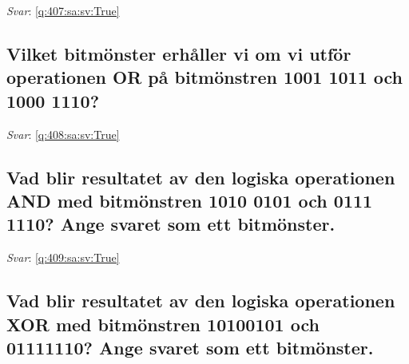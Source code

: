 \documentclass[a4paper,11pt,oneside]{article}
\begin{document}
\begin{sloppypar}
\label{q:407:sa:sv:False}

\vspace{2cm}

\noindent\makebox[\textwidth]{\hrulefill}

\vspace{1cm}

\textit{Svar}: \autoref{q:407:sa:sv:True}



\subsection{Vilket bitm\"onster erh\r{a}ller vi om vi utf\"or operationen OR p\r{a} bitm\"onstren 1001 1011 och 1000 1110?}

\label{q:408:sa:sv:False}

\vspace{2cm}

\noindent\makebox[\textwidth]{\hrulefill}

\vspace{1cm}

\textit{Svar}: \autoref{q:408:sa:sv:True}



\subsection{Vad blir resultatet av den logiska operationen AND med bitm\"onstren 1010 0101 och 0111 1110? Ange svaret som ett bitm\"onster.}

\label{q:409:sa:sv:False}

\vspace{2cm}

\noindent\makebox[\textwidth]{\hrulefill}

\vspace{1cm}

\textit{Svar}: \autoref{q:409:sa:sv:True}



\subsection{Vad blir resultatet av den logiska operationen XOR med bitm\"onstren 10100101 och 01111110? Ange svaret som ett bitm\"onster.}

\label{q:410:sa:sv:False}

\vspace{2cm}

\noindent\makebox[\textwidth]{\hrulefill}


\end{sloppypar}
\end{document}
